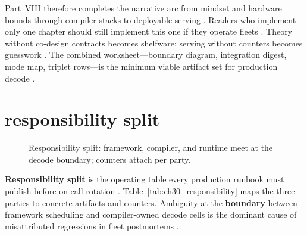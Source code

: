 Part~VIII therefore completes the narrative arc from mindset and hardware bounds through compiler stacks to deployable serving \citep{chen2020compilerbasedhardw,yirage2026,patel2025llminference,kwon2023vllm,taxbreak2026,memoryfloor2026,dlbook}. Readers who implement only one chapter should still implement this one if they operate fleets \citep{patel2025llminference,yirage2026,chen2020compilerbasedhardw,kwon2023vllm,dlbook}. Theory without co-design contracts becomes shelfware; serving without counters becomes guesswork \citep{patel2025llminference,taxbreak2026,memoryfloor2026,yirage2026,chen2020compilerbasedhardw,dlbook}. The combined worksheet---boundary diagram, integration digest, mode map, triplet rows---is the minimum viable artifact set for production decode \citep{kwon2023vllm,yirage2026,chen2020compilerbasedhardw,patel2025llminference,taxbreak2026,memoryfloor2026,nvidia2024cudagraphs,dlbook}.

\section{responsibility split}
\label{sec:ch30_responsibility_split}


\begin{figure}[t]
\centering
{}
\caption{Responsibility split: framework, compiler, and runtime meet at the decode boundary; counters attach per party.}
\label{fig:responsibility_split_pipeline}
\end{figure}

\textbf{Responsibility split} is the operating table every production runbook must publish before on-call rotation \citep{patel2025llminference,yirage2026,chen2020compilerbasedhardw,kwon2023vllm,taxbreak2026,memoryfloor2026,liu2024deepseekv3,nvidia2024cudagraphs,dao2022flashattention,dlbook,semianalysis2024tma,amd2024xdna,amd2024aie,dao2023flashdecoding,nvidia2022hopper}. Table~\ref{tab:ch30_responsibility} maps the three parties to concrete artifacts and counters. Ambiguity at the \textbf{boundary} between framework scheduling and compiler-owned decode cells is the dominant cause of misattributed regressions in fleet postmortems \citep{kwon2023vllm,yirage2026,chen2020compilerbasedhardw,patel2025llminference,taxbreak2026,memoryfloor2026,dlbook}.

